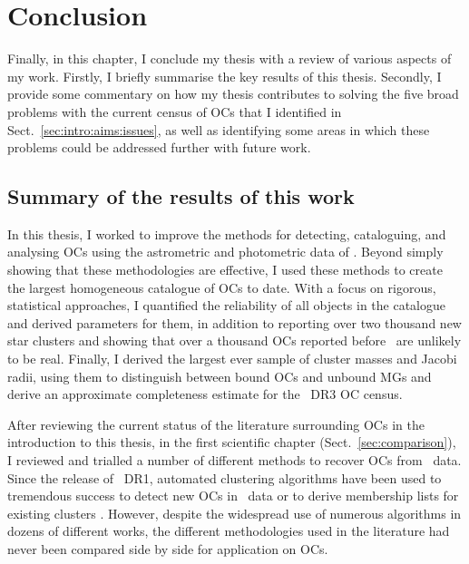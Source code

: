 %
\chapter{Conclusion}
\label{sec:conclusion}



Finally, in this chapter, I conclude my thesis with a review of various aspects of my work. Firstly, I briefly summarise the key results of this thesis. Secondly, I provide some commentary on how my thesis contributes to solving the five broad problems with the current census of OCs that I identified in Sect.~\ref{sec:intro:aims:issues}, as well as identifying some areas in which these problems could be addressed further with future work.


\section{Summary of the results of this work}

In this thesis, I worked to improve the methods for detecting, cataloguing, and analysing OCs using the astrometric and photometric data of \gaia. Beyond simply showing that these methodologies are effective, I used these methods to create the largest homogeneous catalogue of OCs to date. With a focus on rigorous, statistical approaches, I quantified the reliability of all objects in the catalogue and derived parameters for them, in addition to reporting over two thousand new star clusters and showing that over a thousand OCs reported before \gaia\ are unlikely to be real. Finally, I derived the largest ever sample of cluster masses and Jacobi radii, using them to distinguish between bound OCs and unbound MGs and derive an approximate completeness estimate for the \gaia\ DR3 OC census.

After reviewing the current status of the literature surrounding OCs in the introduction to this thesis, in the first scientific chapter (Sect.~\ref{sec:comparison}), I reviewed and trialled a number of different methods to recover OCs from \gaia\ data. Since the release of \gaia\ DR1, automated clustering algorithms have been used to tremendous success to detect new OCs in \gaia\ data or to derive membership lists for existing clusters \citep[e.g.][]{castro-ginard_new_2018,castro-ginard_hunting_2019,castro-ginard_hunting_2020,castro-ginard_hunting_2022,liu_catalog_2019,cantat-gaudin_characterising_2018,cantat-gaudin_clusters_2020,cantat-gaudin_gaia_2019,he_catalogue_2021,he_new_2022,hao_sixteen_2020,jaehnig_membership_2021}. However, despite the widespread use of numerous algorithms in dozens of different works, the different methodologies used in the literature had never been compared side by side for application on OCs.

